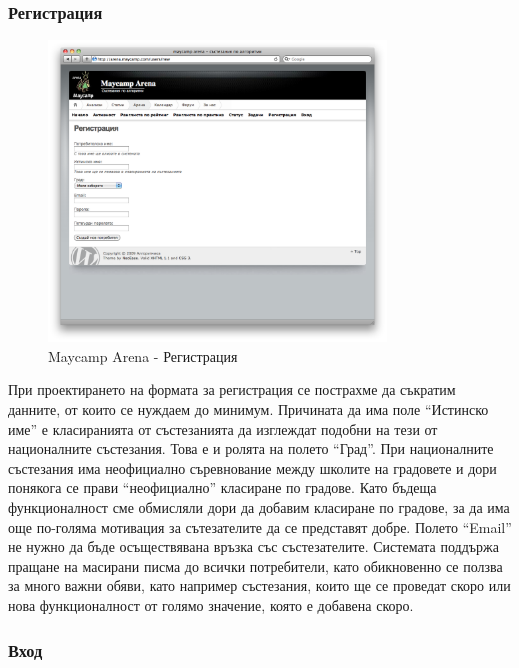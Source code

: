 \documentclass[a4paper,12pt]{article}
\begin{document}
  \subsubsection{Регистрация}
  
  \begin{figure}[ht]
    \begin{center}
      \includegraphics[width=0.8\textwidth]{maycamp_arena_register.png}
    \end{center}
    \caption{Maycamp Arena - Регистрация}
    \label{arena_register}
  \end{figure}
  
  При проектирането на формата за регистрация се пострахме да съкратим данните, от които се нуждаем до минимум. Причината да има поле ``Истинско име'' е класиранията от състезанията да изглеждат подобни на тези от националните състезания. Това е и ролята на полето ``Град''. При националните състезания има неофициално съревнование между школите на градовете и дори понякога се прави ``неофициално'' класиране по градове. Като бъдеща функционалност сме обмисляли дори да добавим класиране по градове, за да има още по-голяма мотивация за сътезателите да се представят добре.
  Полето ``Email'' не нужно да бъде осъществявана връзка със състезателите. Системата поддържа пращане на масирани писма до всички потребители, като обикновенно се ползва за много важни обяви, като например състезания, които ще се проведат скоро или нова функционалност от голямо значение, която е добавена скоро.
    
  \subsubsection{Вход}
\end{document}
